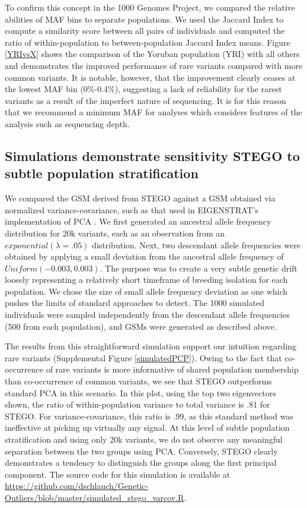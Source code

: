 To confirm this concept in the 1000 Genomes Project, we compared the
relative abilities of MAF bins to separate populations. We used the
Jaccard Index to compute a similarity score between all pairs of individuals
and computed the ratio of within-population to between-population
Jaccard Index means. Figure \ref{YRIvsX} shows the comparison of
the Yoruban population (YRI) with all others and demonstrates the
improved performance of rare variants compared with more common variants.
It is notable, however, that the improvement clearly ceases at the
lowest MAF bin (0\%-0.4\%), suggesting a lack of reliability for the
rarest variants as a result of the imperfect nature of sequencing.
It is for this reason that we recommend a minimum MAF for analyses
which considers features of the analysis such as sequencing depth. 

\subsection{Simulations demonstrate sensitivity STEGO to subtle population stratification}

We compared the GSM derived from STEGO against a GSM obtained via
normalized variance-covariance, such as that used in EIGENSTRAT's
implementation of PCA \cite{price2006principal}. We first generated
an ancestral allele frequency distribution for 20k variants, each
as an observation from an $exponential\left(\lambda=.05\right)$ distribution.
Next, two descendant allele frequencies were obtained by applying
a small deviation from the ancestral allele frequency of $Uniform\left(-0.003,0.003\right)$.
The purpose was to create a very subtle genetic drift loosely representing
a relatively short timeframe of breeding isolation for each population.
We chose the size of small allele frequency deviation as one which
pushes the limits of standard approaches to detect. The 1000 simulated
individuals were sampled independently from the descendant allele
frequencies (500 from each population), and GSMs were generated as
described above.

The results from this straightforward simulation support our intuition
regarding rare variants (Supplemental Figure \ref{simulatedPCP}).
Owing to the fact that co-occurrence of rare variants is more informative
of shared population membership than co-occurrence of common variants,
we see that STEGO outperforms standard PCA in this scenario. In this
plot, using the top two eigenvectors shown, the ratio of within-population
variance to total variance is .81 for STEGO. For variance-covariance,
this ratio is .99, as this standard method was ineffective at picking
up virtually any signal. At this level of subtle population stratification
and using only 20k variants, we do not observe any meaningful separation
between the two groups using PCA. Conversely, STEGO clearly demonstrates
a tendency to distinguish the groups along the first principal component.
The source code for this simulation is available at \url{https://github.com/dschlauch/Genetic-Outliers/blob/master/simulated_stego_varcov.R}.

